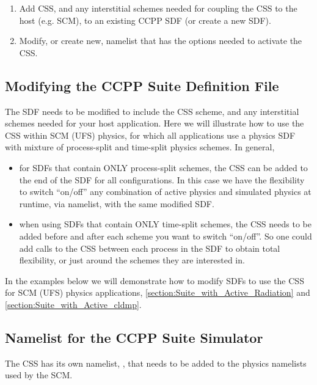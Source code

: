 \begin{enumerate}
\item Add CSS, and any interstitial schemes needed for coupling the CSS to the host (e.g. SCM), to an existing CCPP SDF (or create a new SDF).
\item Modify, or create new, namelist that has the options needed to activate the CSS.
\end{enumerate}

\subsection{Modifying the CCPP Suite Definition File}

The SDF needs to be modified to include the CSS scheme, and any interstitial schemes needed for your host application. Here we will illustrate how to use the CSS within SCM (UFS) physics, for which all applications use a physics SDF with mixture of process-split and time-split physics schemes.
In general,
\begin{itemize}
\item for SDFs that contain ONLY process-split schemes, the CSS can be added to the end of the SDF for all configurations. In this case we have the flexibility to switch ``on/off'' any combination of active physics and simulated physics at runtime, via namelist, with the same modified SDF.
\item when using SDFs that contain ONLY time-split schemes, the CSS needs to be added before and after each scheme you want to switch ``on/off''. So one could add calls to the CSS between each process in the SDF to obtain total flexibility, or just around the schemes they are interested in.
\end{itemize}

In the examples below we will demonstrate how to modify SDFs to use the CSS for SCM (UFS) physics applications, \ref{section:Suite_with_Active_Radiation} and \ref{section:Suite_with_Active_cldmp}.

\subsection{Namelist for the CCPP Suite Simulator}

The CSS has its own namelist, , that needs to be added to the physics namelists used by the SCM.



